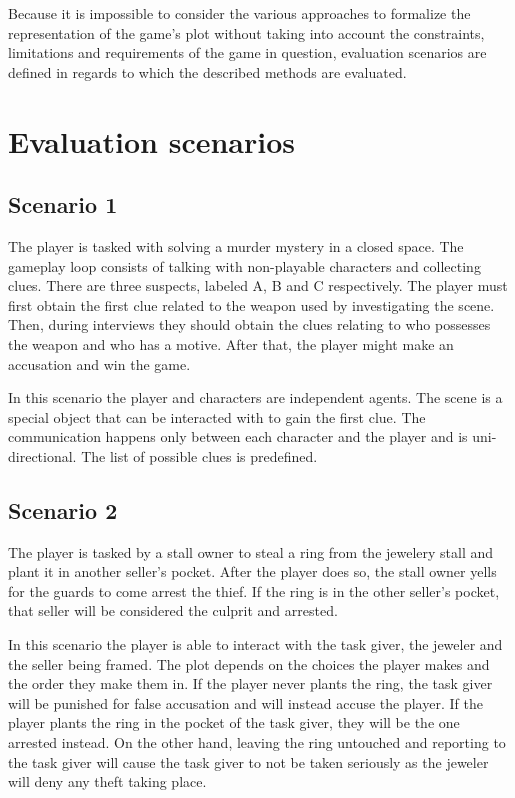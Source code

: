Because it is impossible to consider the various approaches to formalize the representation of the game's plot without taking into account the constraints, limitations and requirements of the game in question, evaluation scenarios are defined in regards to which the described methods are evaluated.


\section{Evaluation scenarios}

\subsection{Scenario 1}

The player is tasked with solving a murder mystery in a closed space.
The gameplay loop consists of talking with non-playable characters and collecting clues.
There are three suspects, labeled A, B and C respectively.
The player must first obtain the first clue related to the weapon used by investigating the scene.
Then, during interviews they should obtain the clues relating to who possesses the weapon and who has a motive.
After that, the player might make an accusation and win the game.

In this scenario the player and characters are independent agents.
The scene is a special object that can be interacted with to gain the first clue.
The communication happens only between each character and the player and is uni-directional.
The list of possible clues is predefined.

\subsection{Scenario 2}

The player is tasked by a stall owner to steal a ring from the jewelery stall and plant it in another seller's pocket.
After the player does so, the stall owner yells for the guards to come arrest the thief.
If the ring is in the other seller's pocket, that seller will be considered the culprit and arrested.

In this scenario the player is able to interact with the task giver, the jeweler and the seller being framed.
The plot depends on the choices the player makes and the order they make them in.
If the player never plants the ring, the task giver will be punished for false accusation and will instead accuse the player.
If the player plants the ring in the pocket of the task giver, they will be the one arrested instead.
On the other hand, leaving the ring untouched and reporting to the task giver will cause the task giver to not be taken seriously as the jeweler will deny any theft taking place.

